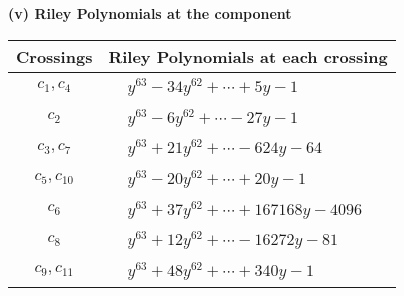 \documentclass[1p]{elsarticle_modified}
\theoremstyle{definition}
\begin{document}
\newpage\renewcommand{\arraystretch}{1}
\flushleft \textbf{(v) Riley Polynomials at the component}\newline \\
\begin{tabular}{m{50pt}|m{274pt}}
Crossings & \hspace{64pt}Riley Polynomials at each crossing \\
\hline $$\begin{aligned}c_{1},c_{4}\end{aligned}$$&$\begin{aligned}
&y^{63}-34 y^{62}+\cdots+5 y-1
\end{aligned}$\\
\hline $$\begin{aligned}c_{2}\end{aligned}$$&$\begin{aligned}
&y^{63}-6 y^{62}+\cdots-27 y-1
\end{aligned}$\\
\hline $$\begin{aligned}c_{3},c_{7}\end{aligned}$$&$\begin{aligned}
&y^{63}+21 y^{62}+\cdots-624 y-64
\end{aligned}$\\
\hline $$\begin{aligned}c_{5},c_{10}\end{aligned}$$&$\begin{aligned}
&y^{63}-20 y^{62}+\cdots+20 y-1
\end{aligned}$\\
\hline $$\begin{aligned}c_{6}\end{aligned}$$&$\begin{aligned}
&y^{63}+37 y^{62}+\cdots+167168 y-4096
\end{aligned}$\\
\hline $$\begin{aligned}c_{8}\end{aligned}$$&$\begin{aligned}
&y^{63}+12 y^{62}+\cdots-16272 y-81
\end{aligned}$\\
\hline $$\begin{aligned}c_{9},c_{11}\end{aligned}$$&$\begin{aligned}
&y^{63}+48 y^{62}+\cdots+340 y-1
\end{aligned}$\\
\hline
\end{tabular}\\~\\
\end{document}
